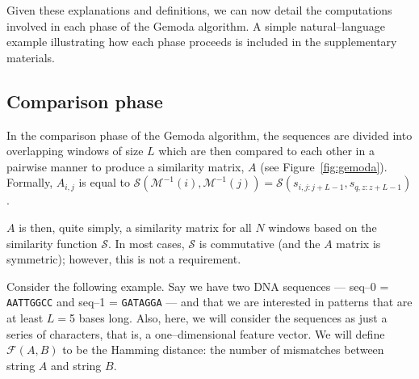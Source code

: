     Given these explanations and definitions, we can now detail
    the computations involved in each phase of the Gemoda algorithm.
    A simple natural--language example illustrating how each phase
    proceeds is included in the supplementary materials.

    \subsection{Comparison phase}
    In the comparison phase of the Gemoda algorithm,
    the sequences are divided into overlapping windows
    of size $L$ which are then compared to each other
    in a pairwise manner to produce a similarity
    matrix, $A$ (see Figure~\vref{fig:gemoda}).
    Formally, $A_{i,j}$ is equal to
    $\mathscr{S}(\mathscr{M}^{-1}(i),\mathscr{M}^{-1}(j))
    = \mathscr{S}(s_{i,j:j+L-1}, s_{q,z:z+L-1})$.

    $A$ is then, quite simply, a similarity matrix
    for all $N$ windows based on the similarity
    function $\mathscr{S}$.
    In most cases, $\mathscr{S}$
    is commutative (and the $A$ matrix is symmetric);
    however, this is not a requirement.

        Consider the following example.
        Say we have two DNA sequences --- seq--0 = \texttt{AATTGGCC}
        and seq--1 = \texttt{GATAGGA} --- and that we are interested
        in patterns that are at least $L=$5 bases long.  Also, here, we
        will consider the sequences as just a series of characters,
        that is, a one--dimensional feature vector.  We will define
        $\mathscr{F}(A,B)$ to be the Hamming distance: the number
        of mismatches between string $A$ and string $B$.

